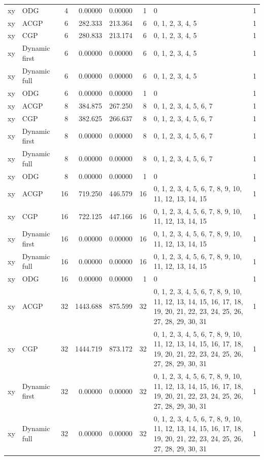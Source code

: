 \documentclass[10pt,a4paper]{article}
\begin{document}
\begin{longtable}{@{}p{23mm}p{29mm}rrrrp{36mm}r@{}}
xy & ODG & 4 & 0.00000 & 0.00000 & 1 & 0 & 1 \\
xy & ACGP & 6 & 282.333 & 213.364 & 6 & 0, 1, 2, 3, 4, 5 & 1 \\
xy & CGP & 6 & 280.833 & 213.174 & 6 & 0, 1, 2, 3, 4, 5 & 1 \\
xy & Dynamic first & 6 & 0.00000 & 0.00000 & 6 & 0, 1, 2, 3, 4, 5 & 1 \\
xy & Dynamic full & 6 & 0.00000 & 0.00000 & 6 & 0, 1, 2, 3, 4, 5 & 1 \\
xy & ODG & 6 & 0.00000 & 0.00000 & 1 & 0 & 1 \\
xy & ACGP & 8 & 384.875 & 267.250 & 8 & 0, 1, 2, 3, 4, 5, 6, 7 & 1 \\
xy & CGP & 8 & 382.625 & 266.637 & 8 & 0, 1, 2, 3, 4, 5, 6, 7 & 1 \\
xy & Dynamic first & 8 & 0.00000 & 0.00000 & 8 & 0, 1, 2, 3, 4, 5, 6, 7 & 1 \\
xy & Dynamic full & 8 & 0.00000 & 0.00000 & 8 & 0, 1, 2, 3, 4, 5, 6, 7 & 1 \\
xy & ODG & 8 & 0.00000 & 0.00000 & 1 & 0 & 1 \\
xy & ACGP & 16 & 719.250 & 446.579 & 16 & 0, 1, 2, 3, 4, 5, 6, 7, 8, 9, 10, 11, 12, 13, 14, 15 & 1 \\
xy & CGP & 16 & 722.125 & 447.166 & 16 & 0, 1, 2, 3, 4, 5, 6, 7, 8, 9, 10, 11, 12, 13, 14, 15 & 1 \\
xy & Dynamic first & 16 & 0.00000 & 0.00000 & 16 & 0, 1, 2, 3, 4, 5, 6, 7, 8, 9, 10, 11, 12, 13, 14, 15 & 1 \\
xy & Dynamic full & 16 & 0.00000 & 0.00000 & 16 & 0, 1, 2, 3, 4, 5, 6, 7, 8, 9, 10, 11, 12, 13, 14, 15 & 1 \\
xy & ODG & 16 & 0.00000 & 0.00000 & 1 & 0 & 1 \\
xy & ACGP & 32 & 1443.688 & 875.599 & 32 & 0, 1, 2, 3, 4, 5, 6, 7, 8, 9, 10, 11, 12, 13, 14, 15, 16, 17, 18, 19, 20, 21, 22, 23, 24, 25, 26, 27, 28, 29, 30, 31 & 1 \\
xy & CGP & 32 & 1444.719 & 873.172 & 32 & 0, 1, 2, 3, 4, 5, 6, 7, 8, 9, 10, 11, 12, 13, 14, 15, 16, 17, 18, 19, 20, 21, 22, 23, 24, 25, 26, 27, 28, 29, 30, 31 & 1 \\
xy & Dynamic first & 32 & 0.00000 & 0.00000 & 32 & 0, 1, 2, 3, 4, 5, 6, 7, 8, 9, 10, 11, 12, 13, 14, 15, 16, 17, 18, 19, 20, 21, 22, 23, 24, 25, 26, 27, 28, 29, 30, 31 & 1 \\
xy & Dynamic full & 32 & 0.00000 & 0.00000 & 32 & 0, 1, 2, 3, 4, 5, 6, 7, 8, 9, 10, 11, 12, 13, 14, 15, 16, 17, 18, 19, 20, 21, 22, 23, 24, 25, 26, 27, 28, 29, 30, 31 & 1 \\

\end{longtable}
\end{document}
